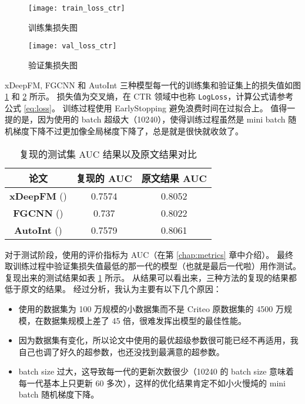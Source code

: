 \documentclass[degree=master,cjk-font=noto]{thuthesis}
\begin{document}
\begin{figure}[h]
\centering%
\texttt{[image: train\_loss\_ctr]}
  \caption{训练集损失图}
  \label{fig:train_loss}
\end{figure}

\begin{figure}[h]
\centering%
\texttt{[image: val\_loss\_ctr]}
  \caption{验证集损失图}
  \label{fig:val_loss}
\end{figure}

xDeepFM, FGCNN 和 AutoInt 三种模型每一代的训练集和验证集上的损失值如图 \ref{fig:train_loss} 和 \ref{fig:val_loss} 所示。
损失值为交叉熵，在 CTR 领域中也称 \texttt{LogLoss}，计算公式请参考公式 \ref{eq:loss}。
训练过程使用 EarlyStopping 避免浪费时间在过拟合上。
值得一提的是，因为使用的 batch 超级大（10240），使得训练过程虽然是 mini batch 随机梯度下降不过更加像全局梯度下降了，总是就是很快就收敛了。

\begin{table}[htb]
  \centering
  \caption{复现的测试集 AUC 结果以及原文结果对比}
  \label{tab:reproduce_auc}
  \begin{tabular}{ccc}
    \toprule
    \textbf{论文}         & \textbf{复现的 AUC}           & \textbf{原文结果 AUC}            \\
    \midrule
    \textbf{xDeepFM} (\cite{xdeepfm}) & 0.7574 & 0.8052 \\
    \textbf{FGCNN} (\cite{fgcnn})           & 0.737           & 0.8022  \\
    \textbf{AutoInt} (\cite{autoint})         & 0.7579           & 0.8061 \\
    \bottomrule
  \end{tabular}
\end{table}

对于测试阶段，使用的评价指标为 AUC（在第 \ref{chap:metrics} 章中介绍）。
最终取训练过程中验证集损失值最低的那一代的模型（也就是最后一代啦）用作测试。
复现出来的测试结果如表 \ref{tab:reproduce_auc} 所示。
从结果可以看出来，三种方法的复现的结果都低于原文的结果。
经过分析，我认为主要有以下几个原因：

\begin{itemize}
  \item 使用的数据集为 100 万规模的小数据集而不是 Criteo 原数据集的 4500 万规模，在数据集规模上差了 45 倍，很难发挥出模型的最佳性能。
  \item 因为数据集有变化，所以论文中使用的最优超级参数很可能已经不再适用，我自己也调了好久的超参数，也还没找到最满意的超参数。
  \item batch size 过大，这导致每一代的更新次数很少（10240 的 batch size 意味着每一代基本上只更新 60 多次），这样的优化结果肯定不如小火慢炖的 mini batch 随机梯度下降。
\end{itemize}
\end{document}
